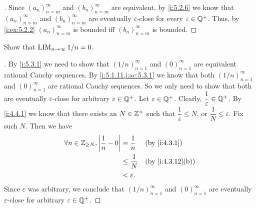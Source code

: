 \begin{proof}[]
  Since \((a_n)_{n = m}^{\infty}\) and \((b_n)_{n = m}^{\infty}\) are equivalent, by \cref{i:5.2.6} we know that \((a_n)_{n = m}^{\infty}\) and \((b_n)_{n = m}^{\infty}\) are eventually \(\varepsilon\)-close for every \(\varepsilon \in \mathbb{Q}^+\).
  Thus, by \cref{i:ex:5.2.2} \((a_n)_{n = m}^{\infty}\) is bounded iff \((b_n)_{n = m}^{\infty}\) is bounded.
\end{proof}

\begin{ex}\label{i:ex:5.3.5}
  Show that \(\operatorname*{LIM}_{n \to \infty} 1 / n = 0\).
\end{ex}

\begin{proof}[]
  By \cref{i:5.3.1} we need to show that \((1 / n)_{n = 1}^\infty\) and \((0)_{n = 1}^\infty\) are equivalent rational Cauchy sequences.
  By \cref{i:5.1.11,i:ac:5.3.1} we know that both \((1/ n)_{n = 1}^{\infty}\) and \((0)_{n = 1}^\infty\) are rational Cauchy sequences.
  So we only need to show that both are eventually \(\varepsilon\)-close for arbitrary \(\varepsilon \in \mathbb{Q}^+\).
  Let \(\varepsilon \in \mathbb{Q}^+\).
  Clearly, \(\dfrac{1}{\varepsilon} \in \mathbb{Q}^+\).
  By \cref{i:4.4.1} we know that there exists an \(N \in \mathbb{Z}^+\) such that \(\dfrac{1}{\varepsilon} \leq N\), or \(\dfrac{1}{N} \leq \varepsilon\).
  Fix such \(N\).
  Then we have
  \begin{align*}
    \forall n \in \Z_{\geq N}, \abs{\dfrac{1}{n} - 0} & = \dfrac{1}{n}    &  & \by{i:4.3.1}     \\
                                                      & \leq \dfrac{1}{N} &  & \by{i:4.3.12}[b] \\
                                                      & < \varepsilon.
  \end{align*}
  Since \(\varepsilon\) was arbitrary, we conclude that \((1 / n)_{n = 1}^\infty\) and \((0)_{n = 1}^\infty\) are eventually \(\varepsilon\)-close for arbitrary \(\varepsilon \in \mathbb{Q}^+\).
\end{proof}
